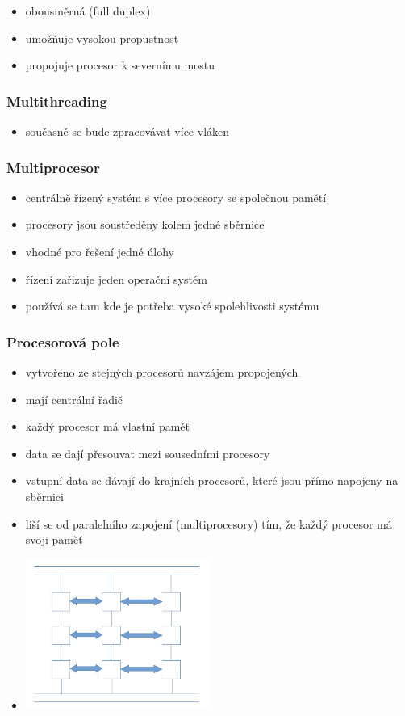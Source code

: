 \documentclass[a4paper,12pt]{article}
\providecommand{\tightlist}{%
\setlength{\itemsep}{0pt}\setlength{\parskip}{0pt}}
\begin{document}
\begin{itemize}
\tightlist
\item obousměrná (full duplex)
\item umožňuje vysokou propustnost
\item propojuje procesor k severnímu mostu
\end{itemize}

\subsubsection{Multithreading}

\begin{itemize}
\tightlist
\item současně se bude zpracovávat více vláken
\end{itemize}

\subsubsection{Multiprocesor}

\begin{itemize}
\tightlist
\item centrálně řízený systém s více procesory se společnou pamětí
\item procesory jsou soustředěny kolem jedné sběrnice
\item vhodné pro řešení jedné úlohy
\item řízení zařizuje jeden operační systém
\item používá se tam kde je potřeba vysoké spolehlivosti systému
\end{itemize}

\subsubsection{Procesorová pole}

\begin{itemize}
\tightlist
\item vytvořeno ze stejných procesorů navzájem propojených
\item mají centrální řadič
\item každý procesor má vlastní paměť
\item data se dají přesouvat mezi sousedními procesory
\item vstupní data se dávají do krajních procesorů, které jsou přímo
  napojeny na sběrnici
\item liší se od paralelního zapojení (multiprocesory) tím, že každý
  procesor má svoji paměť
\item[] \includegraphics[width=6.034cm]{ref/paralelni-procesory.png}
\end{itemize}
\end{document}
